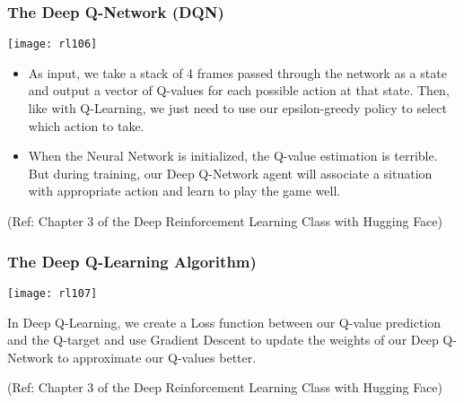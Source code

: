 \begin{frame}[fragile]\frametitle{The Deep Q-Network (DQN)}

\begin{center}
\texttt{[image: rl106]}
\end{center}

\begin{itemize}
\item As input, we take a stack of 4 frames passed through the network as a state and output a vector of Q-values for each possible action at that state. Then, like with Q-Learning, we just need to use our epsilon-greedy policy to select which action to take.

\item When the Neural Network is initialized, the Q-value estimation is terrible. But during training, our Deep Q-Network agent will associate a situation with appropriate action and learn to play the game well.
\end{itemize}

{\tiny (Ref: Chapter 3 of the Deep Reinforcement Learning Class with Hugging Face)}

\end{frame}

\begin{frame}[fragile]\frametitle{The Deep Q-Learning Algorithm)}

\begin{center}
\texttt{[image: rl107]}
\end{center}

In Deep Q-Learning, we create a Loss function between our Q-value prediction and the Q-target and use Gradient Descent to update the weights of our Deep Q-Network to approximate our Q-values better.

{\tiny (Ref: Chapter 3 of the Deep Reinforcement Learning Class with Hugging Face)}

\end{frame}

